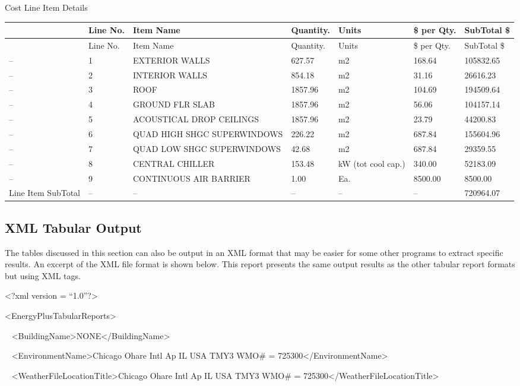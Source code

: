 Cost Line Item Details

\begin{longtable}[c]{>{\raggedright}p{0.85in}>{\raggedright}p{0.85in}>{\raggedright}p{0.85in}>{\raggedright}p{0.85in}>{\raggedright}p{0.85in}>{\raggedright}p{0.85in}>{\raggedright}p{0.85in}}
\toprule 
~ & Line No. & Item Name & Quantity. & Units & \$ per Qty. & SubTotal \$ \tabularnewline
\midrule
\endfirsthead

\toprule 
~ & Line No. & Item Name & Quantity. & Units & \$ per Qty. & SubTotal \$ \tabularnewline
\midrule
\endhead

-- & 1 & EXTERIOR WALLS & 627.57 & m2 & 168.64 & 105832.65 \tabularnewline
-- & 2 & INTERIOR WALLS & 854.18 & m2 & 31.16 & 26616.23 \tabularnewline
-- & 3 & ROOF & 1857.96 & m2 & 104.69 & 194509.64 \tabularnewline
-- & 4 & GROUND FLR SLAB & 1857.96 & m2 & 56.06 & 104157.14 \tabularnewline
-- & 5 & ACOUSTICAL DROP CEILINGS & 1857.96 & m2 & 23.79 & 44200.83 \tabularnewline
-- & 6 & QUAD HIGH SHGC SUPERWINDOWS & 226.22 & m2 & 687.84 & 155604.96 \tabularnewline
-- & 7 & QUAD LOW SHGC SUPERWINDOWS & 42.68 & m2 & 687.84 & 29359.55 \tabularnewline
-- & 8 & CENTRAL CHILLER & 153.48 & kW (tot cool cap.) & 340.00 & 52183.09 \tabularnewline
-- & 9 & CONTINUOUS AIR BARRIER & 1.00 & Ea. & 8500.00 & 8500.00 \tabularnewline
Line Item SubTotal & -- & -- & -- & -- & -- & 720964.07 \tabularnewline
\bottomrule
\end{longtable}

\subsection{XML Tabular Output}\label{xml-tabular-output}

The tables discussed in this section can also be output in an XML format that may be easier for some other programs to extract specific results. An excerpt of the XML file format is shown below. This report presents the same output results as the other tabular report formats but using XML tags.

\textless{}?xml version = ``1.0''?\textgreater{}

\textless{}EnergyPlusTabularReports\textgreater{}

~ \textless{}BuildingName\textgreater{}NONE\textless{}/BuildingName\textgreater{}

~ \textless{}EnvironmentName\textgreater{}Chicago Ohare Intl Ap IL USA TMY3 WMO\# = 725300\textless{}/EnvironmentName\textgreater{}

~ \textless{}WeatherFileLocationTitle\textgreater{}Chicago Ohare Intl Ap IL USA TMY3 WMO\# = 725300\textless{}/WeatherFileLocationTitle\textgreater{}

